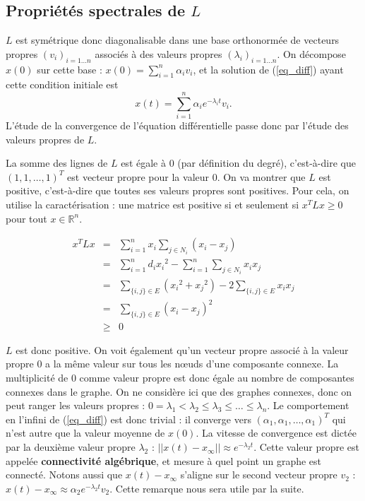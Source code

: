 \documentclass[12pt]{article}
\newcommand{\R}{\mathbb{R}}
\begin{document}
\subsection{Propriétés spectrales de $L$}
\label{props_spectrales_L}
$L$ est symétrique donc diagonalisable dans une base orthonormée de
vecteurs propres $(v_i)_{i=1\dots n}$ associés à des valeurs propres
$(\lambda_i)_{i=1 \dots n}$. On décompose $x(0)$ sur cette base : $x(0)
= \sum_{i=1}^n \alpha_i v_i$, et la solution de (\ref{eq_diff}) ayant
cette condition initiale est $$x(t) = \sum_{i=1}^n \alpha_i e^{-
 \lambda_i t} v_i.$$ L'étude de la convergence de l'équation
différentielle passe donc par l'étude des valeurs propres de $L$.

La somme des lignes de $L$ est égale à $0$ (par définition du degré),
c'est-à-dire que $(1, 1, \dots, 1)^T$ est vecteur propre pour la valeur
$0$. On va montrer que $L$ est positive, c'est-à-dire que toutes ses
valeurs propres sont positives. Pour cela, on utilise la
caractérisation : une matrice est positive si et seulement si $x^T L x \geq 0$ pour
tout $x \in \R^n$.

\begin{eqnarray*}
 x^T L x & = & \sum_{i = 1}^n x_i \sum_{j \in N_i} (x_i - x_j) \\
 & = & \sum_{i = 1}^n d_i {x_i}^2 - \sum_{i = 1}^n \sum_{j \in N_i} x_i x_j \\
 & = & \sum_{\{i, j\} \in E} ({x_i}^2 + {x_j}^2) - 2 \sum_{\{i, j\} \in E} x_i x_j \\
 & = & \sum_{\{i, j\} \in E} (x_i - x_j)^2 \\
 & \geq & 0
\end{eqnarray*}

$L$ est donc positive. On voit également qu'un vecteur propre associé
à la valeur propre $0$ a la même valeur sur tous les n\oe uds d'une
composante connexe. La multiplicité de $0$ comme valeur propre est
donc égale au nombre de composantes connexes dans le graphe. On ne
considère ici que des graphes connexes, donc on peut ranger les
valeurs propres : $0 = \lambda_1 < \lambda_2 \leq \lambda_3 \leq \dots
\leq \lambda_n$. Le comportement en l'infini de (\ref{eq_diff}) est
donc trivial : il converge vers $(\alpha_1, \alpha_1, \dots,
\alpha_1)^T$ qui n'est autre que la valeur moyenne de $x(0)$. La
vitesse de convergence est dictée par la deuxième valeur propre
$\lambda_2$ : $||x(t) - x_\infty|| \approx e^{-\lambda_2 t}$. Cette
valeur propre est appelée {\bf connectivité algébrique}, et mesure à
quel point un graphe est connecté. Notons aussi que $x(t) - x_\infty$
s'aligne sur le second vecteur propre $v_2$ : $x(t) - x_\infty \approx
\alpha_2 e^{-\lambda_2 t} v_2$. Cette remarque nous sera utile par la
suite.
\end{document}
